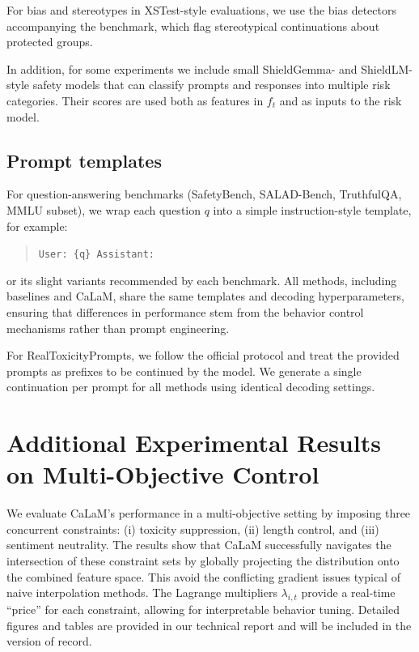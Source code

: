 \documentclass{article}
\theoremstyle{plain}
\theoremstyle{definition}
\theoremstyle{remark}
\begin{document}
For bias and stereotypes in XSTest-style evaluations, we use the bias detectors accompanying the benchmark, which flag stereotypical continuations about protected groups.

In addition, for some experiments we include small ShieldGemma- and ShieldLM-style safety models that can classify prompts and responses into multiple risk categories.
Their scores are used both as features in $f_t$ and as inputs to the risk model.

\subsection{Prompt templates}

For question-answering benchmarks (SafetyBench, SALAD-Bench, TruthfulQA, MMLU subset), we wrap each question $q$ into a simple instruction-style template, for example:
\begin{quote}
\small
\texttt{User: \{q\} Assistant:}
\end{quote}
or its slight variants recommended by each benchmark.
All methods, including baselines and CaLaM, share the same templates and decoding hyperparameters, ensuring that differences in performance stem from the behavior control mechanisms rather than prompt engineering.

For RealToxicityPrompts, we follow the official protocol and treat the provided prompts as prefixes to be continued by the model.
We generate a single continuation per prompt for all methods using identical decoding settings.


\section{Additional Experimental Results on Multi-Objective Control}
\label{app:multi-obj}

We evaluate CaLaM's performance in a multi-objective setting by imposing three concurrent constraints: (i) toxicity suppression, (ii) length control, and (iii) sentiment neutrality. The results show that CaLaM successfully navigates the intersection of these constraint sets by globally projecting the distribution onto the combined feature space. This avoid the conflicting gradient issues typical of naive interpolation methods. The Lagrange multipliers $\lambda_{i,t}$ provide a real-time ``price'' for each constraint, allowing for interpretable behavior tuning. Detailed figures and tables are provided in our technical report and will be included in the version of record.
\end{document}
